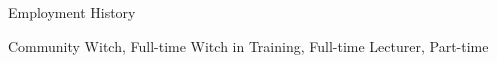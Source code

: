 \begin{rubric}{Employment History}

\entry*[2014 -- ] Community Witch, Full-time
\entry*[2012 -- 2014] Witch in Training, Full-time
%
%
\entry*[2013 -- 2015] Lecturer, Part-time
%
\end{rubric}